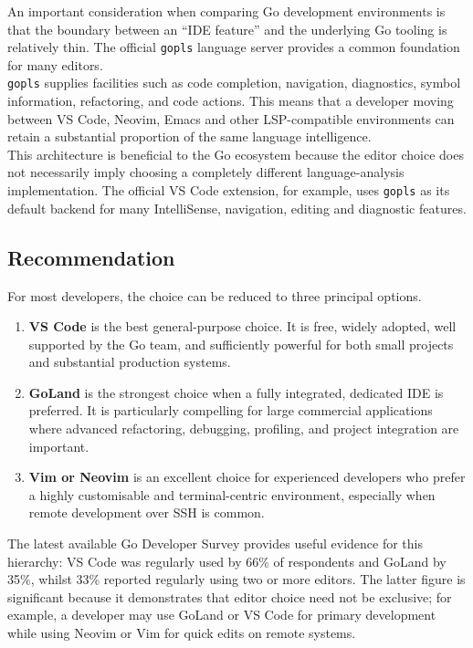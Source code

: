 An important consideration when comparing Go development environments is that the boundary between an ``IDE feature'' and the underlying Go tooling is relatively thin. The official \texttt{gopls} language server provides a common foundation for many editors.\\

\texttt{gopls} supplies facilities such as code completion, navigation, diagnostics, symbol information, refactoring, and code actions. This means that a developer moving between VS Code, Neovim, Emacs and other LSP-compatible environments can retain a substantial proportion of the same language intelligence.\\

This architecture is beneficial to the Go ecosystem because the editor choice does not necessarily imply choosing a completely different language-analysis implementation. The official VS Code extension, for example, uses \texttt{gopls} as its default backend for many IntelliSense, navigation, editing and diagnostic features.

\subsection{Recommendation}

For most developers, the choice can be reduced to three principal options.

\begin{enumerate}
\item \textbf{VS Code} is the best general-purpose choice. It is free, widely adopted, well supported by the Go team, and sufficiently powerful for both small projects and substantial production systems.

\item \textbf{GoLand} is the strongest choice when a fully integrated, dedicated IDE is preferred. It is particularly compelling for large commercial applications where advanced refactoring, debugging, profiling, and project integration are important.

\item \textbf{Vim or Neovim} is an excellent choice for experienced developers who prefer a highly customisable and terminal-centric environment, especially when remote development over SSH is common.\\

\end{enumerate}

The latest available Go Developer Survey provides useful evidence for this hierarchy: VS Code was regularly used by 66\% of respondents and GoLand by 35\%, whilst 33\% reported regularly using two or more editors. The latter figure is significant because it demonstrates that editor choice need not be exclusive; for example, a developer may use GoLand or VS Code for primary development while using Neovim or Vim for quick edits on remote systems.\\

